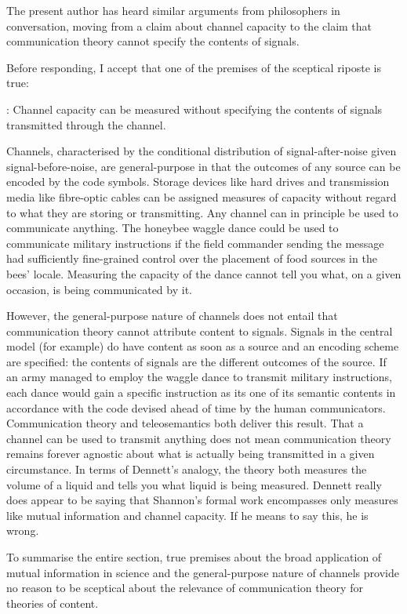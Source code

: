 \documentclass[12pt]{article}
\begin{document}
\noindent The present author has heard similar arguments from philosophers in conversation, moving from a claim about channel capacity to the claim that communication theory cannot specify the contents of signals.

Before responding, I accept that one of the premises of the sceptical riposte is true:

\begin{myquote}
\cia{}: Channel capacity can be measured without specifying the contents of signals transmitted through the channel.
\end{myquote}

\noindent Channels, characterised by the conditional distribution of signal-after-noise given signal-before-noise, are general-purpose in that the outcomes of any source can be encoded by the code symbols.
Storage devices like hard drives and transmission media like fibre-optic cables can be assigned measures of capacity without regard to what they are storing or transmitting.
Any channel can in principle be used to communicate anything.
The honeybee waggle dance could be used to communicate military instructions if the field commander sending the message had sufficiently fine-grained control over the placement of food sources in the bees' locale.
Measuring the capacity of the dance cannot tell you what, on a given occasion, is being communicated by it.

However, the general-purpose nature of channels does not entail that communication theory cannot attribute content to signals.
Signals in the central model (for example) do have content as soon as a source and an encoding scheme are specified: the contents of signals are the different outcomes of the source.
If an army managed to employ the waggle dance to transmit military instructions, each dance would gain a specific instruction as its one of its semantic contents in accordance with the code devised ahead of time by the human communicators.
Communication theory and teleosemantics both deliver this result.
That a channel can be used to transmit anything does not mean communication theory remains forever agnostic about what is actually being transmitted in a given circumstance.
In terms of Dennett's analogy, the theory both measures the volume of a liquid and tells you what liquid is being measured.
Dennett really does appear to be saying that Shannon's formal work encompasses only measures like mutual information and channel capacity.
If he means to say this, he is wrong.

To summarise the entire section, true premises about the broad application of mutual information in science and the general-purpose nature of channels provide no reason to be sceptical about the relevance of communication theory for theories of content.




\printbibliography
\end{document}
